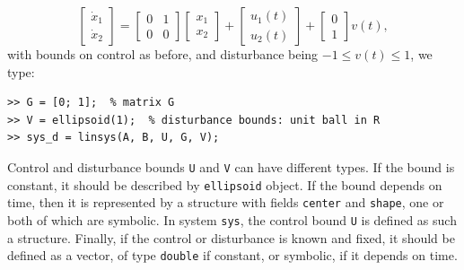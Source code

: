 \documentclass{report}
\begin{document}
\[ \left[\begin{array}{cc}
\dot{x}_1\\
\dot{x}_2\end{array}\right] = \left[\begin{array}{cc}
0 & 1\\
0 & 0\end{array}\right]\left[\begin{array}{c}
x_1\\
x_2\end{array}\right] + \left[\begin{array}{c}
u_1(t)\\
u_2(t)\end{array}\right] + \left[\begin{array}{c}
0\\
1\end{array}\right]v(t), \]
with bounds on control as before, and disturbance being $-1\leq v(t)\leq1$,
we type:
{\tt \begin{verbatim}
>> G = [0; 1];  % matrix G
>> V = ellipsoid(1);  % disturbance bounds: unit ball in R
>> sys_d = linsys(A, B, U, G, V);
\end{verbatim} }
Control and disturbance bounds {\tt U} and {\tt V} can have different types.
If the bound is constant, it should be described by {\tt ellipsoid} object.
If the bound depends on time, then it is represented by a structure with
fields {\tt center} and {\tt shape}, one or both of which are symbolic.
In system {\tt sys}, the control bound {\tt U} is defined as such a structure.
Finally, if the control or disturbance is known and fixed, it should be
defined as a vector, of type {\tt double} if constant, or symbolic, if
it depends on time.
\end{document}
